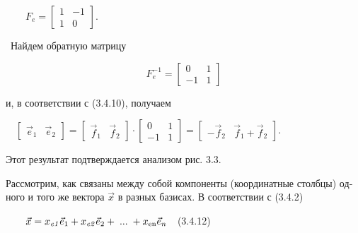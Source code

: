 \documentclass[a4paper]{article}
\newcommand\normalsubformula[1]{\text{\mathversion{normal}$#1$}}
\begin{document}
{\begin{russian}\sffamily
\ \ \ \  $F_e=\left[\begin{matrix}1&-1\\1&0\end{matrix}\right]$.
\end{russian}}

{\begin{russian}\sffamily
\ Найдем обратную матрицу
\end{russian}}

\begin{equation*}
F_e^{-1}=\left[\begin{matrix}0&1\\-1&1\end{matrix}\right]
\end{equation*}
{\begin{russian}\sffamily
и, в соответствии с (3.4.10), получаем
\end{russian}}

{\begin{russian}\sffamily
\ \  $\left[\begin{matrix}\vec e_1&\vec e_2\end{matrix}\right]=\left[\begin{matrix}\vec f_1&\vec
f_2\end{matrix}\right]\cdot \left[\begin{matrix}0&1\\-1&1\end{matrix}\right]=\left[\begin{matrix}-\vec f_2&\vec
f_1+\vec f_2\end{matrix}\right]$.
\end{russian}}

{\begin{russian}\sffamily
Этот результат подтверждается анализом рис. 3.3.
\end{russian}}

{\begin{russian}\sffamily
Рассмотрим, как связаны между собой компоненты (координатные столбцы) одного и того же вектора  $\vec x$ в разных
базисах. В соответствии с (3.4.2)\ \ \ \ \ \ 
\end{russian}}

{\begin{russian}\sffamily
\ \ \ \  $\vec x=x_{\mathit{e1}}\vec e_1+x_{\mathit{e2}}\vec e_2+\;...\;+x_{\normalsubformula{\text{en}}}\vec
e_n$\ \ (3.4.12)
\end{russian}}
\end{document}
